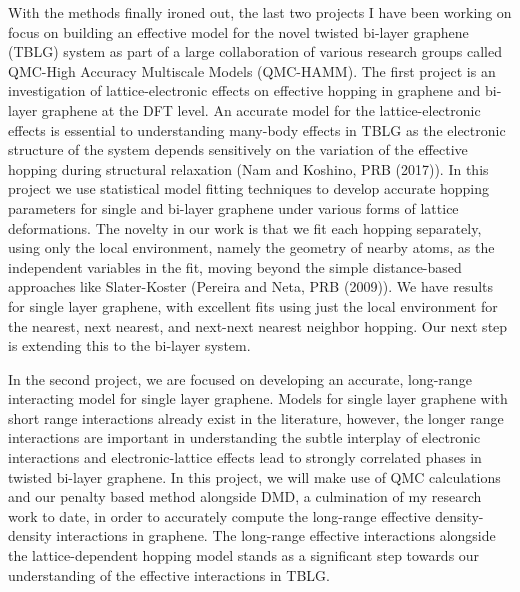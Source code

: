 \documentclass{article}
\begin{document}
With the methods finally ironed out, the last two projects I have been working on focus on building an effective model for the novel twisted bi-layer graphene (TBLG) system as part of a large collaboration of various research groups called QMC-High Accuracy Multiscale Models (QMC-HAMM).
The first project is an investigation of lattice-electronic effects on effective hopping in graphene and bi-layer graphene at the DFT level.
An accurate model for the lattice-electronic effects is essential to understanding many-body effects in TBLG as the electronic structure of the system depends sensitively on the variation of the effective hopping during structural relaxation (Nam and Koshino, PRB (2017)).
In this project we use statistical model fitting techniques to develop accurate hopping parameters for single and bi-layer graphene under various forms of lattice deformations.
The novelty in our work is that we fit each hopping separately, using only the local environment, namely the geometry of nearby atoms, as the independent variables in the fit, moving beyond the simple distance-based approaches like Slater-Koster (Pereira and Neta, PRB (2009)).
We have results for single layer graphene, with excellent fits using just the local environment for the nearest, next nearest, and next-next nearest neighbor hopping.
Our next step is extending this to the bi-layer system.

In the second project, we are focused on developing an accurate, long-range interacting model for single layer graphene.
Models for single layer graphene with short range interactions already exist in the literature, however, the longer range interactions are important in understanding the subtle interplay of electronic interactions and electronic-lattice effects lead to strongly correlated phases in twisted bi-layer graphene.
In this project, we will make use of QMC calculations and our penalty based method alongside DMD, a culmination of my research work to date, in order to accurately compute the long-range effective density-density interactions in graphene.
The long-range effective interactions alongside the lattice-dependent hopping model stands as a significant step towards our understanding of the effective interactions in TBLG.
\end{document}
